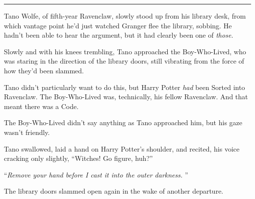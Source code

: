 \begin{center}\rule{3in}{0.4pt}\end{center}

Tano Wolfe, of fifth-year Ravenclaw, slowly stood up from his library
desk, from which vantage point he'd just watched Granger flee the
library, sobbing. He hadn't been able to hear the argument, but it had
clearly been one of \emph{those.}

Slowly and with his knees trembling, Tano approached the Boy-Who-Lived,
who was staring in the direction of the library doors, still vibrating
from the force of how they'd been slammed.

Tano didn't particularly want to do this, but Harry Potter \emph{had}
been Sorted into Ravenclaw. The Boy-Who-Lived was, technically, his
fellow Ravenclaw. And that meant there was a Code.

The Boy-Who-Lived didn't say anything as Tano approached him, but his
gaze wasn't friendly.

Tano swallowed, laid a hand on Harry Potter's shoulder, and recited, his
voice cracking only slightly, ``Witches! Go figure, huh?''

``\emph{Remove your hand before I cast it into the outer darkness.} ''

The library doors slammed open again in the wake of another departure.
